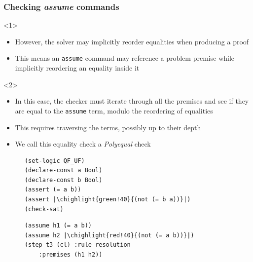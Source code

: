 \documentclass[usepdftitle=false,aspectratio=169]{beamer}
\newcommand\vitem{\vfill\item}
\newcommand\chighlight[2]{\setlength{\fboxsep}{0pt}\colorbox{#1}{#2\strut}}
\begin{document}
\begin{frame}[fragile]
  \frametitle{Checking \textit{assume} commands}
  \begin{onlyenv}<1>
    \begin{minipage}[c][0.75 \textheight]{0.55 \textwidth}
      \begin{itemize}
        \vitem However, the solver may implicitly reorder equalities when
        producing a proof
        \vitem This means an \texttt{assume} command may reference a problem
        premise while implicitly reordering an equality inside it
        \vfill
      \end{itemize}
    \end{minipage}
  \end{onlyenv}
  \begin{onlyenv}<2>
    \begin{minipage}[c][0.75 \textheight]{0.55 \textwidth}
      \begin{itemize}
        \vitem In this case, the checker must iterate through all the premises
        and see if they are equal to the \texttt{assume} term, modulo the
        reordering of equalities
        \vitem This requires traversing the terms, possibly up to their depth
        \vitem We call this equality check a \textit{Polyequal} check
        \vfill
      \end{itemize}
    \end{minipage}
  \end{onlyenv}
  \hfill
  \begin{minipage}{0.4 \textwidth}
    \begin{verbatim}
      (set-logic QF_UF)
      (declare-const a Bool)
      (declare-const b Bool)
      (assert (= a b))
      (assert |\chighlight{green!40}{(not (= b a))}|)
      (check-sat)
    \end{verbatim}
    \begin{verbatim}
      (assume h1 (= a b))
      (assume h2 |\chighlight{red!40}{(not (= a b))}|)
      (step t3 (cl) :rule resolution
          :premises (h1 h2))
    \end{verbatim}
  \end{minipage}
\end{frame}
\end{document}
